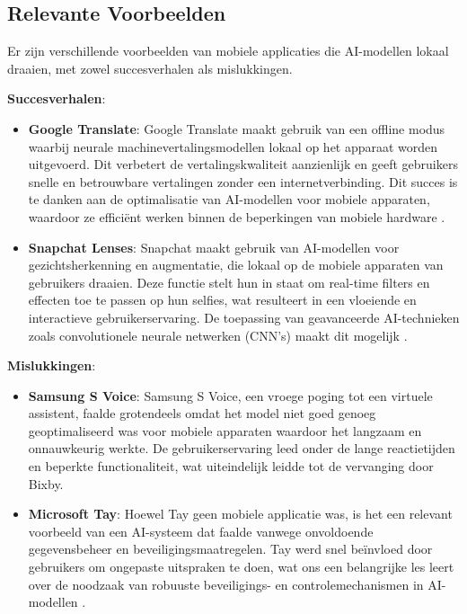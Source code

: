 \subsection{Relevante Voorbeelden}

Er zijn verschillende voorbeelden van mobiele applicaties die AI-modellen lokaal draaien, met zowel succesverhalen als mislukkingen.

\textbf{Succesverhalen}:
\begin{itemize}
    \item \textbf{Google Translate}: Google Translate maakt gebruik van een offline modus waarbij neurale machinevertalingsmodellen lokaal op het apparaat worden uitgevoerd. Dit verbetert de vertalingskwaliteit aanzienlijk en geeft gebruikers snelle en betrouwbare vertalingen zonder een internetverbinding. Dit succes is te danken aan de optimalisatie van AI-modellen voor mobiele apparaten, waardoor ze efficiënt werken binnen de beperkingen van mobiele hardware \autocite{Castanyer2021}.
    
    \item \textbf{Snapchat Lenses}: Snapchat maakt gebruik van AI-modellen voor gezichtsherkenning en augmentatie, die lokaal op de mobiele apparaten van gebruikers draaien. Deze functie stelt hun in staat om real-time filters en effecten toe te passen op hun selfies, wat resulteert in een vloeiende en interactieve gebruikerservaring. De toepassing van geavanceerde AI-technieken zoals convolutionele neurale netwerken (CNN's) maakt dit mogelijk \autocite{Campos2019}.
\end{itemize}

\textbf{Mislukkingen}:
\begin{itemize}
    \item \textbf{Samsung S Voice}: Samsung S Voice, een vroege poging tot een virtuele assistent, faalde grotendeels omdat het model niet goed genoeg geoptimaliseerd was voor mobiele apparaten waardoor het langzaam en onnauwkeurig werkte. De gebruikerservaring leed onder de lange reactietijden en beperkte functionaliteit, wat uiteindelijk leidde tot de vervanging door Bixby.
    
    \item \textbf{Microsoft Tay}: Hoewel Tay geen mobiele applicatie was, is het een relevant voorbeeld van een AI-systeem dat faalde vanwege onvoldoende gegevensbeheer en beveiligingsmaatregelen. Tay werd snel beïnvloed door gebruikers om ongepaste uitspraken te doen, wat ons een belangrijke les leert over de noodzaak van robuuste beveiligings- en controlemechanismen in AI-modellen \autocite{Shiffrin2023}.
\end{itemize}

